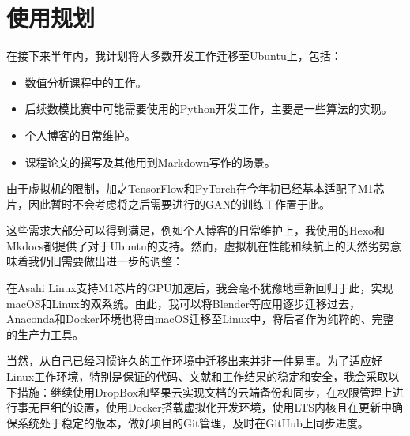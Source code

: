 \documentclass{ctexart}
\begin{document}
\section{使用规划}

在接下来半年内，我计划将大多数开发工作迁移至Ubuntu上，包括：

\begin{itemize}
	\item 数值分析课程中的工作。
	\item 后续数模比赛中可能需要使用的Python开发工作，主要是一些算法的实现。
	\item 个人博客的日常维护。
	\item 课程论文的撰写及其他用到Markdown写作的场景。
\end{itemize}

由于虚拟机的限制，加之TensorFlow和PyTorch在今年初已经基本适配了M1芯片，因此暂时不会考虑将之后需要进行的GAN的训练工作置于此。

这些需求大部分可以得到满足，例如个人博客的日常维护上，我使用的Hexo和Mkdocs都提供了对于Ubuntu的支持。然而，虚拟机在性能和续航上的天然劣势意味着我仍旧需要做出进一步的调整：

在Asahi Linux支持M1芯片的GPU加速后，我会毫不犹豫地重新回归于此，实现macOS和Linux的双系统。由此，我可以将Blender等应用逐步迁移过去，Anaconda和Docker环境也将由macOS迁移至Linux中，将后者作为纯粹的、完整的生产力工具。

当然，从自己已经习惯许久的工作环境中迁移出来并非一件易事。为了适应好Linux工作环境，特别是保证的代码、文献和工作结果的稳定和安全，我会采取以下措施：继续使用DropBox和坚果云实现文档的云端备份和同步，在权限管理上进行事无巨细的设置，使用Docker搭载虚拟化开发环境，使用LTS内核且在更新中确保系统处于稳定的版本\textsuperscript{\cite{ref3}}，做好项目的Git管理，及时在GitHub上同步进度。



\end{document}

